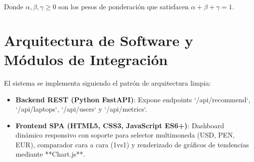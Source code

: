Donde $\alpha, \beta, \gamma \ge 0$ son los pesos de ponderación que satisfacen $\alpha + \beta + \gamma = 1$.

\section{Arquitectura de Software y Módulos de Integración}
El sistema se implementa siguiendo el patrón de arquitectura limpia:
\begin{itemize}
    \item \textbf{Backend REST (Python FastAPI)}: Expone endpoints `/api/recommend`, `/api/laptops`, `/api/users` y `/api/metrics`.
    \item \textbf{Frontend SPA (HTML5, CSS3, JavaScript ES6+)}: Dashboard dinámico responsivo con soporte para selector multimoneda (USD, PEN, EUR), comparador cara a cara (1vs1) y renderizado de gráficos de tendencias mediante **Chart.js**.
\end{itemize}
